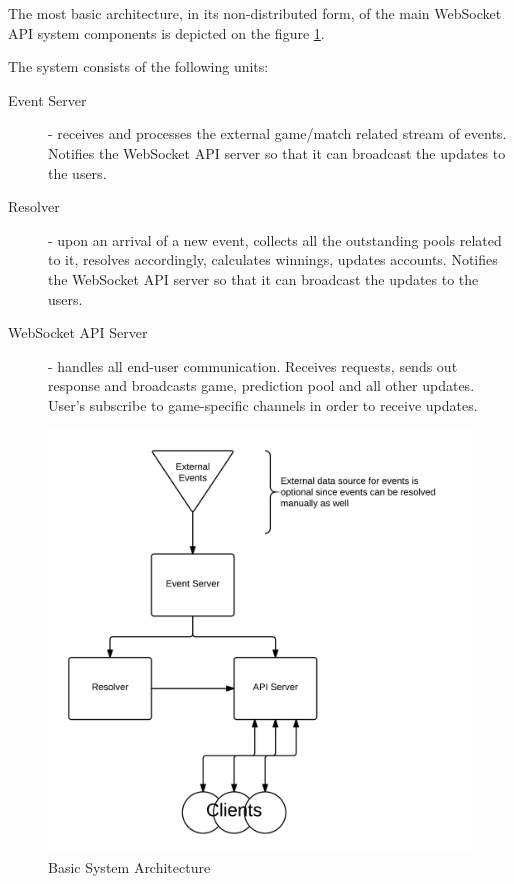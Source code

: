 \documentclass{uvamscse}
\begin{document}
The most basic architecture, in its non-distributed form, of the main WebSocket API system components is depicted on the figure \ref{figure:architecture}.

The system consists of the following units:
\begin{description}
  \item[Event Server]
  - receives and processes the external game/match related stream of events. Notifies the WebSocket API server so that it can broadcast the updates to the users.
  \item[Resolver]
  - upon an arrival of a new event, collects all the outstanding pools related to it, resolves accordingly, calculates winnings, updates accounts. Notifies the WebSocket API server so that it can broadcast the updates to the users.
  \item[WebSocket API Server]
  - handles all end-user communication. Receives requests, sends out response and broadcasts game, prediction pool and all other updates. User's subscribe to game-specific channels in order to receive updates.
\end{description}

\begin{figure}[h]
\centering
\includegraphics[scale=0.15]{architecture}
\caption{Basic System Architecture}
\label{figure:architecture}
\end{figure}
\end{document}
